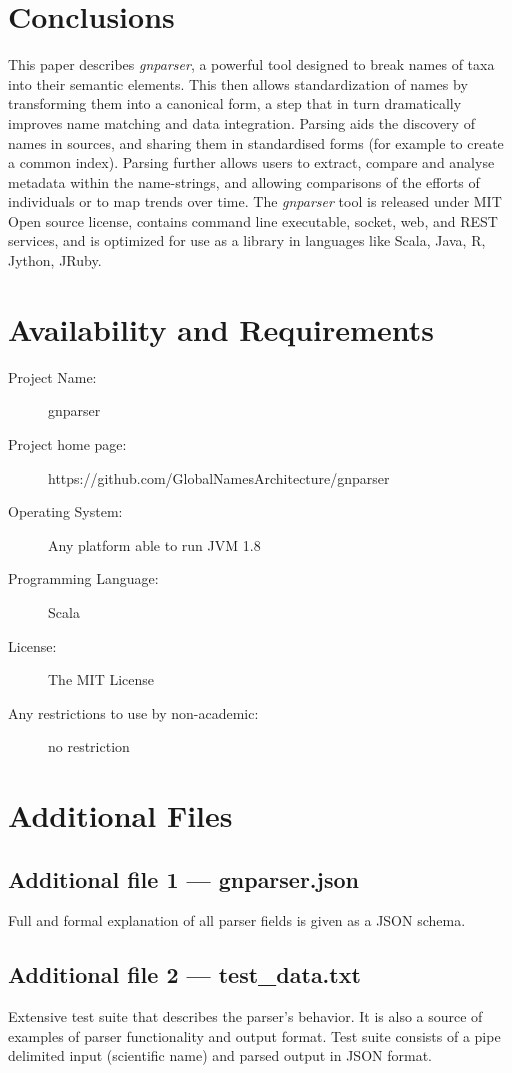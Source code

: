 \documentclass{bmcart}
\begin{document}
\section*{Conclusions}

This paper describes  \textit{gnparser}, a powerful tool designed to break
names of taxa into their semantic elements.  This then allows standardization
of names by transforming them into a canonical form, a step that in turn
dramatically improves name matching and data integration. Parsing aids the
discovery of names in sources, and sharing them in standardised forms (for
example to create a common index).  Parsing further allows users to extract,
compare and analyse metadata within the name-strings, and allowing comparisons
of the efforts of individuals or to map trends over time. The \textit{gnparser}
tool is released under MIT Open source license, contains command line
executable, socket, web, and REST services, and is optimized for use as a
library in languages like Scala, Java, R, Jython, JRuby.

\section*{Availability and Requirements}

\begin{description}
  \item[Project Name:] gnparser
  \item[Project home page:] https://github.com/GlobalNamesArchitecture/gnparser
  \item[Operating System:] Any platform able to run JVM 1.8
  \item[Programming Language:] Scala
  \item[License:] The MIT License
  \item[Any restrictions to use by non-academic:] no restriction
\end{description}

\section*{Additional Files}

  \subsection*{Additional file 1 --- gnparser.json}
  Full and formal explanation of all parser fields is given as a JSON schema.

  \subsection*{Additional file 2 --- test\_data.txt}
  Extensive test suite that describes the parser's behavior. It is also a
  source of examples of parser functionality and output format.
  Test suite consists of a pipe delimited input (scientific name) and parsed
  output in JSON format.
\end{document}
